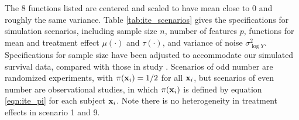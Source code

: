     The 8 functions listed are centered and scaled to have mean close to 0 and roughly the same variance. Table \ref{tab:ite_scenarios} gives the specifications for simulation scenarios, including sample size $n$, number of features $p$, functions for mean and treatment effect $\mu(\cdot)$ and $\tau(\cdot)$, and variance of noise $\sigma_{\log Y}^2$. Specifications for sample size have been adjusted to accommodate our simulated survival data, compared with those in study \cite{powers2017some}. Scenarios of odd number are randomized experiments, with $\pi(\mathbf{x}_i) = 1/2$ for all $\mathbf{x}_i$, but scenarios of even number are observational studies, in which $\pi(\mathbf{x}_i)$ is defined by equation \ref{eqn:ite_pi} for each subject $\mathbf{x}_i$. Note there is no heterogeneity in treatment effects in scenario 1 and 9.

